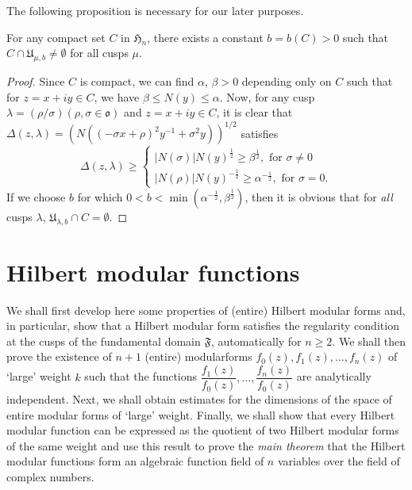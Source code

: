 The following proposition is necessary for our later purposes.

\begin{proposition}\label{prop23}
For any compact set $C$ in $\mathfrak{H}_{n}$, there exists a constant
$b=b(C)>0$ such that $C\cap \mathfrak{U}_{\mu,b}\neq \emptyset$ for
all cusps $\mu$.
\end{proposition}

\begin{proof}
Since $C$ is compact, we can find $\alpha$, $\beta>0$ depending only
on $C$ such that for $z=x+iy\in C$, we have $\beta\leq N(y)\leq
\alpha$. Now, for any cusp
$\lambda=(\rho/\sigma)(\rho,\sigma\in\mathfrak{o})$ and $z=x+iy\in C$,
it is clear that $\Delta(z,\lambda)=(N((-\sigma
x+\rho)^{2}y^{-1}+\sigma^{2}y))^{1/2}$ satisfies
$$
\Delta(z,\lambda)\geq
\begin{cases}
|N(\sigma)|N(y)^{\frac{1}{2}}\geq \beta^{\frac{1}{2}},\text{ \ for \ }
\sigma\neq 0\\
|N(\rho)|N(y)^{-\frac{1}{2}}\geq \alpha^{-\frac{1}{2}}, \text{ \ for
  \ } \sigma=0.
\end{cases}
$$
If we choose $b$ for which
$0<b<\min(\alpha^{-\frac{1}{2}},\beta^{\frac{1}{2}})$, then it is
obvious that for {\em all} cusps $\lambda$,
$\mathfrak{U}_{\lambda,b}\cap C=\emptyset$.
\end{proof}

\section{Hilbert modular functions}\label{chap3:sec3}

We shall first develop here some properties of (entire) Hilbert
modular forms and, in particular, show that a Hilbert modular form
satisfies the regularity condition at the cusps of the fundamental
domain $\mathfrak{F}$, automatically for $n\geq 2$. We shall then
prove the existence of $n+1$ (entire) modular\pageoriginale forms
$f_{0}(z),f_{1}(z),\ldots,f_{n}(z)$ of `large' weight $k$ such that
the functions
$\dfrac{f_{1}(z)}{f_{0}(z)},\ldots,\dfrac{f_{n}(z)}{f_{0}(z)}$ are
analytically independent. Next, we shall obtain estimates for the
dimensions of the space of entire modular forms of `large'
weight. Finally, we shall show that every Hilbert modular function can
be expressed as the quotient of two Hilbert modular forms of the same
weight and use this result to prove the {\em main theorem} that the
Hilbert modular functions form an algebraic function field of $n$
variables over the field of complex numbers.

